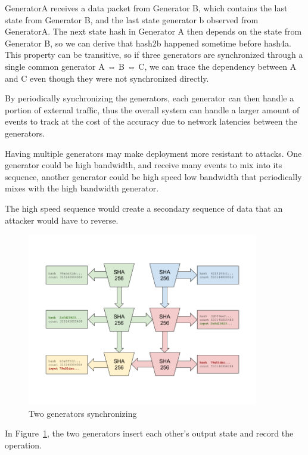 \documentclass[12pt]{article}
\begin{document}
GeneratorA receives a data packet from Generator B, which contains the last state from Generator B, and the last state generator b observed from GeneratorA.  The next state hash in Generator A then depends on the state from Generator B, so we can derive that hash2b happened sometime before hash4a.  This property can be transitive, so if three generators are synchronized through a single common generator A ⇔ B ⇔ C, we can trace the dependency between A and C even though they were not synchronized directly.

By periodically synchronizing the generators, each generator can then handle a portion of external traffic, thus the overall system can handle a larger amount of events to track at the cost of the accuracy due to network latencies between the generators.

Having multiple generators may make deployment more resistant to attacks.  One generator could be high bandwidth, and receive many events to mix into its sequence, another generator could be high speed low bandwidth that periodically mixes with the high bandwidth generator.

The high speed sequence would create a secondary sequence of data that an attacker would have to reverse.

\begin{figure}
  \begin{center}
    \centering
    \includegraphics[width=0.9\textwidth]{figures/fig_5.png}
    \caption[Fig 5]{Two generators synchronizing\label{fig:poh_scale}}
  \end{center}
  \end{figure}

In Figure~\ref{fig:poh_scale}, the two generators insert each other’s output state and record the operation.  
\end{document}
